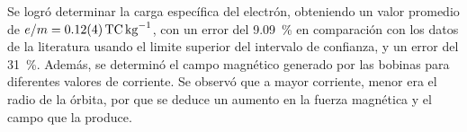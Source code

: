 Se logró determinar la carga específica del electrón, obteniendo un valor
promedio de \( e/m = \qty{0.12(4)}{\tera\C\per\kg} \), con un error del
\qty{9.09}{\percent} en comparación con los datos de la literatura usando el
limite superior del intervalo de confianza, y un error del \qty{31}{\percent}.
Además, se determinó el campo magnético generado por las bobinas para diferentes
valores de corriente.
Se observó que a mayor corriente, menor era el radio de la órbita, por que se
deduce un aumento en la fuerza magnética y el campo que la produce.
